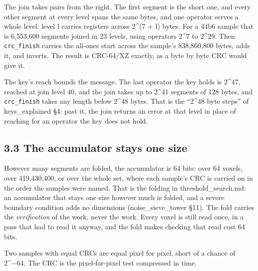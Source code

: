 The join takes pairs from the right. The first segment is the short one, and every other segment at every level spans the same bytes, and one operator serves a whole level: level l carries registers across 2\textasciicircum{}(7 + l) bytes. For a 44b6 sample that is 6,553,600 segments joined in 23 levels, using operators 2\textasciicircum{}7 to 2\textasciicircum{}29. Then \texttt{crc\_\allowbreak{}finish} carries the all-ones start across the sample's 838,860,800 bytes, adds it, and inverts. The result is CRC-64/XZ exactly, as a byte by byte CRC would give it.

The key's reach bounds the message. The last operator the key holds is 2\textasciicircum{}47, reached at join level 40, and the join takes up to 2\textasciicircum{}41 segments of 128 bytes, and \texttt{crc\_\allowbreak{}finish} takes any length below 2\textasciicircum{}48 bytes. That is the “2\textasciicircum{}48 byte steps” of keys\_\allowbreak{}explained §4: past it, the join returns an error at that level in place of reaching for an operator the key does not hold.

\subsection{\texorpdfstring{3.3 The accumulator stays one size}{3.3 The accumulator stays one size}}

However many segments are folded, the accumulator is 64 bits: over 64 voxels, over 419,430,400, or over the whole set, where each sample's CRC is carried on in the order the samples were named. That is the folding in threshold\_\allowbreak{}search.md: an accumulator that stays one size however much is folded, and a severe boundary condition adds no dimensions (noise\_\allowbreak{}sieve\_\allowbreak{}tower §11). The fold carries the \emph{verification} of the work, never the work. Every voxel is still read once, in a pass that had to read it anyway, and the fold makes checking that read cost 64 bits.

Two samples with equal CRCs are equal pixel for pixel, short of a chance of 2\textasciicircum{}−64. The CRC is the pixel-for-pixel test compressed in time.

